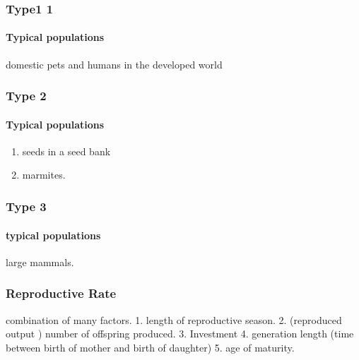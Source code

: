 \documentclass[]{article}
\providecommand{\tightlist}{%
  \setlength{\itemsep}{0pt}\setlength{\parskip}{0pt}}
\let\oldparagraph\paragraph
\renewcommand{\paragraph}[1]{\oldparagraph{#1}\mbox{}}
\begin{document}
\hypertarget{type1-1}{%
\subsubsection{Type1 1}\label{type1-1}}

\hypertarget{typical-populations}{%
\paragraph{Typical populations}\label{typical-populations}}

domestic pets and humans in the developed world

\hypertarget{type-2}{%
\subsubsection{Type 2}\label{type-2}}

\hypertarget{typical-populations-1}{%
\paragraph{Typical populations}\label{typical-populations-1}}

\begin{enumerate}
\def\labelenumi{\arabic{enumi}.}
\tightlist
\item
  seeds in a seed bank
\item
  marmites.
\end{enumerate}

\hypertarget{type-3}{%
\subsubsection{Type 3}\label{type-3}}

\hypertarget{typical-populations-2}{%
\paragraph{typical populations}\label{typical-populations-2}}

large mammals.

\hypertarget{reproductive-rate}{%
\subsubsection{Reproductive Rate}\label{reproductive-rate}}

combination of many factors. 1. length of reproductive season. 2.
(reproduced output ) number of offspring produced. 3. Investment 4.
generation length (time between birth of mother and birth of daughter)
5. age of maturity.
\end{document}

